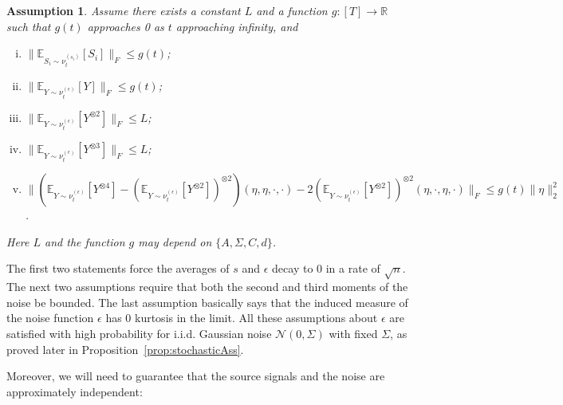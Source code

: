 \documentclass[twoside,11pt]{article}
\newcommand{\E}{\mathbb{E}}
\newcommand{\real}{\mathbb{R}}
\newcommand{\iid}{i.i.d.\xspace}
\newtheorem{assumption}{Assumption}
\begin{document}
\begin{assumption}
\label{ass:gauss}
Assume there exists a constant $L$ and a function $g:[T]\rightarrow \real$ such that $g(t)$ approaches 0 as $t$ approaching infinity, and
\begin{enumerate}[(i)]
\item $\| \E_{S_i\sim \nu_t^{(s_i)}} [S_i] \|_F\le g(t)$; %
\item $\| \E_{Y \sim \nu_t^{(\epsilon)}} [Y] \|_F \le g(t)$; %
\item $\| \E_{Y\sim \nu_t^{(\epsilon)}} [Y^{\otimes 2}] \|_F \le L$;
\item $\| \E_{Y\sim \nu_t^{(\epsilon)}} [Y^{\otimes 3}] \|_F \le L$;
\item $\| \left(\E_{Y\sim \nu_t^{(\epsilon)}} [Y^{\otimes4}] - (\E_{Y\sim \nu_t^{(\epsilon)}} [Y^{\otimes2}])^{\otimes 2}\right)(\eta,\eta,\cdot,\cdot)  - 2 (\E_{Y\sim \nu_t^{(\epsilon)}} [Y^{\otimes2}])^{\otimes 2}(\eta,\cdot,\eta,\cdot)\|_F\le g(t)\|\eta\|_2^2$. %
\end{enumerate}
Here $L$ and the function $g$ may depend on $\{A,\Sigma,C,d\}$.
\end{assumption}
\begin{remark}
The first two statements force the averages of $s$ and $\epsilon$ decay to 0 in a rate of $\sqrt{n}$.
The next two assumptions require that both the second and third moments of the noise be bounded.
The last assumption basically says that the induced measure of the noise function $\epsilon$ has 0 kurtosis in the limit.
All these assumptions about $\epsilon$ are satisfied with high probability for \iid Gaussian noise $\mathcal{N}(0,\Sigma)$ with fixed $\Sigma$, as proved later in Proposition~\ref{prop:stochasticAss}.
\end{remark}
Moreover, we will need to guarantee that the source signals and the noise are approximately independent:
\end{document}
